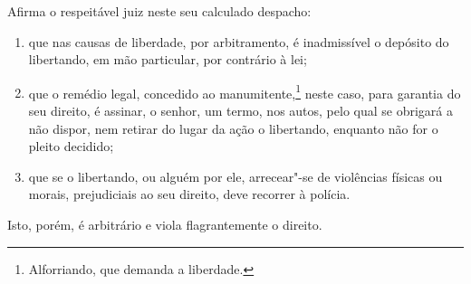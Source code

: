 Afirma o respeitável juiz neste seu calculado despacho:

\begin{enumerate}[label=\arabic*º]
\item que nas causas de liberdade, por arbitramento, é inadmissível
o depósito do libertando, em mão particular, por contrário à lei;

\item que o remédio legal, concedido ao manumitente,\footnote{
  Alforriando, que demanda a liberdade.} neste caso, para garantia do
seu direito, é assinar, o senhor, um termo, nos autos, pelo qual se
obrigará a não dispor, nem retirar do lugar da ação o libertando,
enquanto não for o pleito decidido;

\item que se o libertando, ou alguém por ele, arrecear"-se de
violências físicas ou morais, prejudiciais ao seu direito, deve recorrer
à polícia.
\end{enumerate}

Isto, porém, é arbitrário e viola flagrantemente o direito.

